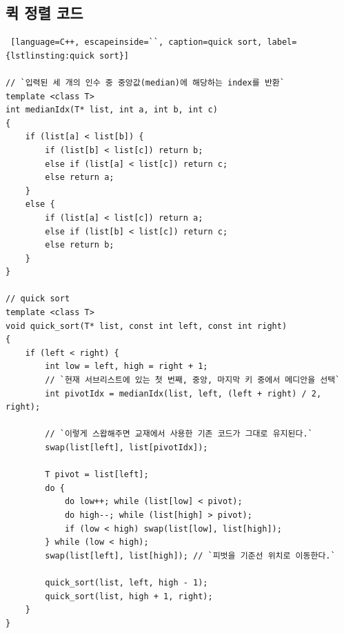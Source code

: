 \documentclass{article}
\begin{document}
\subsection{퀵 정렬 코드}
\begin{lstlisting} [language=C++, escapeinside=``, caption=quick sort, label={lstlinsting:quick sort}]

// `입력된 세 개의 인수 중 중앙값(median)에 해당하는 index를 반환`
template <class T>
int medianIdx(T* list, int a, int b, int c)
{
	if (list[a] < list[b]) {
		if (list[b] < list[c]) return b;
		else if (list[a] < list[c]) return c;
		else return a;
	}
	else {
		if (list[a] < list[c]) return a;
		else if (list[b] < list[c]) return c;
		else return b;
	}
}

// quick sort
template <class T>
void quick_sort(T* list, const int left, const int right)
{
	if (left < right) {
		int low = left, high = right + 1;
		// `현재 서브리스트에 있는 첫 번째, 중앙, 마지막 키 중에서 메디안을 선택`
		int pivotIdx = medianIdx(list, left, (left + right) / 2, right);
		
		// `이렇게 스왑해주면 교재에서 사용한 기존 코드가 그대로 유지된다.`
		swap(list[left], list[pivotIdx]);
		
		T pivot = list[left];
		do {
			do low++; while (list[low] < pivot);
			do high--; while (list[high] > pivot);
			if (low < high) swap(list[low], list[high]);
		} while (low < high);
		swap(list[left], list[high]); // `피벗을 기준선 위치로 이동한다.`

		quick_sort(list, left, high - 1);
		quick_sort(list, high + 1, right);
	}
}
\end{lstlisting}
\end{document}
